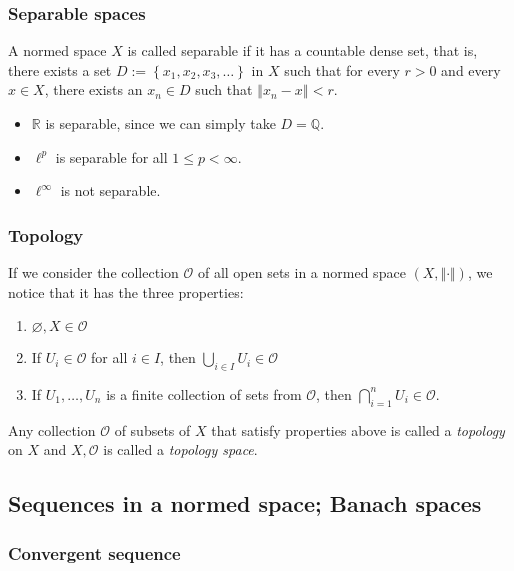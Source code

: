 \documentclass[
	border={25mm 20mm 25mm 30mm},  %
	varwidth,  %
	utf8,
]{standalone}
\newenvironment{myindentpar}[1]%
	{\begin{list}{}%
			{\setlength{\leftmargin}{#1}}%
			\item[]%
	}
 {\end{list}}
\begin{document}
\subsubsection{Separable spaces}

A normed space \(X\) is called separable if it has a countable dense set, that is, there exists a set \(D:=\left\{x_1,x_2,x_3,\ldots\right\}\) in \(X\) such that for every \(r>0\) and every \(x\in X\), there exists an \(x_n\in D\) such that \(\left\Vert x_n-x\right\Vert<r\).
\begin{itemize}
	\item \(\mathbb{R}\) is separable, since we can simply take \(D=\mathbb{Q}\).
	\item \(\ell^p\) is separable for all \(1\leqslant p<\infty\).
	\item \(\ell^\infty\) is not separable.
\end{itemize}

\subsubsection{Topology}

If we consider the collection \(\mathcal{O}\) of all open sets in a normed space \(\left(X,\Vert\cdot\Vert\right)\), we notice that it has the three properties:
\begin{myindentpar}{1em}
	\begin{enumerate}[(1)]
		\item \(\varnothing,X\in\mathcal{O}\)
		\item If \(U_i\in\mathcal{O}\) for all \(i\in I\), then \(\displaystyle\bigcup_{i\in I}{U_i}\in\mathcal{O}\)
		\item If \(U_1,\ldots,U_n\) is a finite collection of sets from \(\mathcal{O}\), then \(\displaystyle\bigcap_{i=1}^n{U_i}\in\mathcal{O}\).
	\end{enumerate}
\end{myindentpar}
Any collection \(\mathcal{O}\) of subsets of \(X\) that satisfy properties above is called a \textit{topology} on \(X\) and \(X,\mathcal{O}\) is called a \textit{topology space}.

\subsection{Sequences in a normed space; Banach spaces}

\subsubsection{Convergent sequence}
\end{document}
